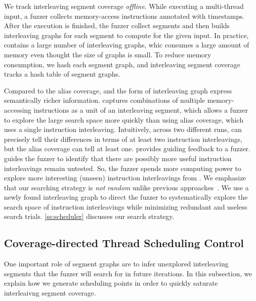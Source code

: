 We track interleaving segment coverage \textit{offline}. While
executing a multi-thread input, a fuzzer collects memory-access
instructions annotated with timestamps. After the execution is
finished, the fuzzer collect segments and then builds interleaving 
graphs for each segment to compute \intcov for the given input.
In practice, \intcov contains a large number of interleaving graphs, 
whic consumes a large amount of memory even thought the size of graphs is 
small.
To reduce memory consumption, we hash each segment graph,
and interleaving segment coverage tracks a hash table of segment
graphs.
%





Compared to the alias coverage, \intcov and the form of interleaving graph
express semantically richer information. \Intcov captures combinations 
of multiple memory-accessing instructions as a unit of an interleaving segment, which allows a fuzzer to explore the large search space more quickly than using alias coverage, which uses a single instruction interleaving. Intuitively, across two different runs, \intcov can precisely tell 
their differences in terms of at least two instruction interleavings, 
but the alias coverage can tell at least one.
\Intcov provides guiding feedback to a fuzzer.
\Intcov guides the fuzzer to identify that there are possibly more useful instruction interleavings remain untested. So, the fuzzer spends
more computing power to explore more interesting (unseen) instruction interleavings from \intcov. We emphasize that our searching strategy is 
\textit{not random} unlike previous approaches~.
We use a newly found interleaving graph 
to direct the fuzzer to systematically explore 
the search space of instruction interleavings while minimizing
redundant and useless search trials. \autoref{ss:scheduler} 
discusses our search strategy.


\subsection{Coverage-directed Thread Scheduling Control}
\label{ss:scheduler}
%
One important role of segment graphs are to infer unexplored
interleaving segments that the fuzzer will search for in future
iterations.
%
In this subsection, we explain how we generate scheduling points in
order to quickly saturate interleaivng segment coverage.


